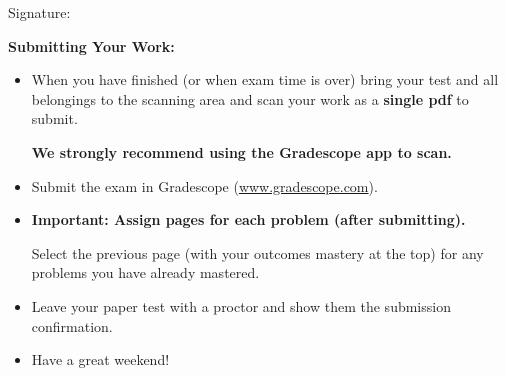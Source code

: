 Signature: \underline{\hspace{10 cm}}


\vfill
\eject

{\bf Submitting Your Work:}
\begin{itemize}



			\item When you have finished  (or when exam time is over) bring your test and all belongings to the scanning area and scan your work as a \textbf{single pdf} to submit.  
	
				{\bf We strongly recommend using the Gradescope app to scan.}
	
			\item Submit the exam  in Gradescope (\url{www.gradescope.com}).
			

			\item {\bf Important: Assign pages for each problem (after submitting).}
			
				Select the previous page (with your outcomes mastery at the top) for any problems you have already mastered.
				
			\item Leave your paper test with a proctor and show them the submission confirmation.  
			
			\item Have a great weekend!


	\end{itemize}


